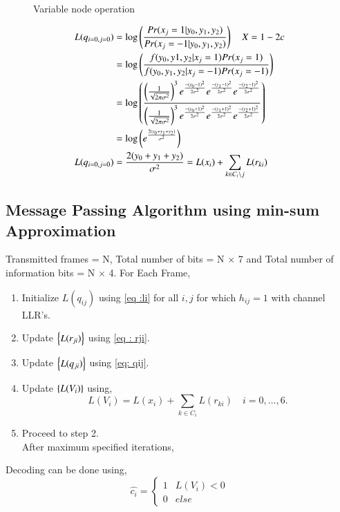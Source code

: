 \documentclass[journal,12pt,twocolumn]{IEEEtran}
\begin{document}
\begin{enumerate}
\begin{figure}[!ht]
\begin{center}
\end{center}
\caption{Variable node operation}
\label{fig : var}
\end{figure}
\begin{align}
L(q_{i=0,j=0})&=\log \left(\frac{Pr(x_j=1|y_0,y_1,y_2)}{Pr(x_j=-1|y_0,y_1,y_2)}\right) \quad X=1-2c\\
&= \log \left(\frac{f(y_0,y1,y_2|x_j=1)Pr(x_j=1)}{f(y_0,y_1,y_2|x_j=-1)Pr(x_j=-1)}\right) \\
&= \log \left(\frac{\left(\frac{1}{\sqrt{2\pi\sigma^2}}\right)^3e^{\frac{-(y_0-1)^2}{2\sigma^2}}e^{\frac{-(y_1-1)^2}{2\sigma^2}}e^{\frac{-(y_2-1)^2}{2\sigma^2}}}{\left(\frac{1}{\sqrt{2\pi\sigma^2}}\right)^3e ^{\frac{-(y_0+1)^2}{2\sigma^2}}e ^{\frac{-(y_1+1)^2}{2\sigma^2}}e ^{\frac{-(y_2+1)^2}{2\sigma^2}} }  \right) \\
&=\log \left(e^{\frac{2(y_0+y_1+y_2)}{\sigma^2}}\right) \\
L(q_{i=0,j=0})&= \frac{2(y_0+y_1+y_2)}{\sigma^2}=L(x_i)+\sum_{k \in C_i\setminus j} L(r_{ki}) \label{eq: qij}
\end{align}
\end{enumerate}

\subsection{Message Passing Algorithm using min-sum Approximation}
Transmitted frames = N, Total number of bits = N $\times$ 7 and Total number of information bits = N $\times$ 4.
For Each Frame,
\begin{enumerate}
\item Initialize $L(q_{ij})$ using \eqref{eq :li} for all $i,j$ for which $h_{ij}=1$ with channel LLR's.
\item Update $\left\{L(r_{ji})\right\}$ using \eqref{eq : rji}.
\item Update $\left\{L(q_{ji})\right\}$ using \eqref{eq: qij}.
\item Update $\left\{L(V_i)\right\}$ using,
\begin{equation}
L(V_i)=L(x_i)+\sum_{k \in C_i} L(r_{ki}) \quad i=0,\dots,6.
\end{equation}
\item Proceed to step 2.\\
After maximum specified iterations,

\end{enumerate}
Decoding can be done using,
\begin{equation}
\hat{c_i} = \begin{cases}
1 & L(V_i) < 0\\
0 & else
\end{cases}
\end{equation}
%
\end{document}
